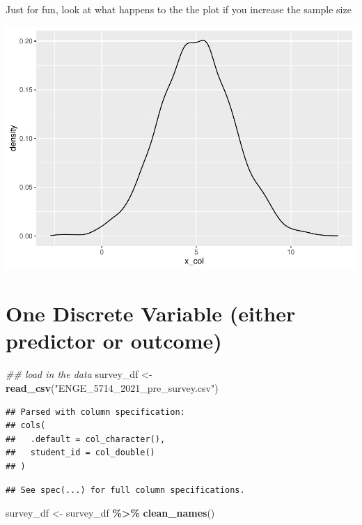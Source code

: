 \documentclass[
]{book}
\newenvironment{Shaded}{\begin{snugshade}}{\end{snugshade}}
\newcommand{\CommentTok}[1]{\textcolor[rgb]{0.56,0.35,0.01}{\textit{#1}}}
\newcommand{\KeywordTok}[1]{\textcolor[rgb]{0.13,0.29,0.53}{\textbf{#1}}}
\newcommand{\NormalTok}[1]{#1}
\newcommand{\OperatorTok}[1]{\textcolor[rgb]{0.81,0.36,0.00}{\textbf{#1}}}
\newcommand{\StringTok}[1]{\textcolor[rgb]{0.31,0.60,0.02}{#1}}
\begin{document}
Just for fun, look at what happens to the the plot if you increase the sample size

\includegraphics{test_course_notes_files/figure-latex/unnamed-chunk-16-1.pdf}

\hypertarget{one-discrete-variable-either-predictor-or-outcome}{%
\section{One Discrete Variable (either predictor or outcome)}\label{one-discrete-variable-either-predictor-or-outcome}}

\begin{Shaded}
\begin{Highlighting}[]
\CommentTok{\#\# load in the data}
\NormalTok{survey\_df \textless{}{-}}\StringTok{ }\KeywordTok{read\_csv}\NormalTok{(}\StringTok{"ENGE\_5714\_2021\_pre\_survey.csv"}\NormalTok{)}
\end{Highlighting}
\end{Shaded}

\begin{verbatim}
## Parsed with column specification:
## cols(
##   .default = col_character(),
##   student_id = col_double()
## )
\end{verbatim}

\begin{verbatim}
## See spec(...) for full column specifications.
\end{verbatim}

\begin{Shaded}
\begin{Highlighting}[]
\NormalTok{survey\_df \textless{}{-}}\StringTok{ }\NormalTok{survey\_df }\OperatorTok{\%\textgreater{}\%}\StringTok{ }\KeywordTok{clean\_names}\NormalTok{()}
\end{Highlighting}
\end{Shaded}
\end{document}
